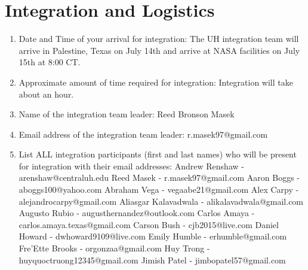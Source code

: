 \newpage
\section{Integration and Logistics}
\label{sec:Logistics}

\hspace*{0.5cm}
\begin{minipage}{\linewidth-0.5cm}
  \begin{enumerate}[label = \Alph*.]
  \item Date and Time of your arrival for integration: \newline
    The UH integration team will arrive in Palestine, Texas on July 14th and arrive at NASA facilities on July 15th at 8:00 CT.
  \item Approximate amount of time required for integration: \newline
    Integration will take about an hour.
  \item Name of the integration team leader: Reed Bronson Masek    
  \item Email address of the integration team leader: r.masek97@gmail.com
  \item List ALL integration participants (first and last names) who will be present for integration with their email addresses: \newline
    Andrew Renshaw - arenshaw@centraluh.edu \newline
    Reed Masek - r.masek97@gmail.com \newline
    Aaron Boggs - aboggs100@yahoo.com \newline
    Abraham Vega - vegaabe21@gmail.com \newline
    Alex Carpy - alejandrocarpy@gmail.com \newline
    Aliasgar Kalavadwala - alikalavadwala@gmail.com \newline
    Augusto Rubio - augusthernandez@outlook.com \newline
    Carlos Amaya - carlos.amaya.texas@gmail.com \newline
    Carson Bush - cjb2015@live.com \newline
    Daniel Howard - dwhoward9109@live.com \newline
    Emily Humble - erhumble@gmail.com \newline
    Fre'Ette Brooks - orgonzaa@gmail.com \newline
    Huy Trong - huyquoctruong12345@gmail.com \newline
    Jimish Patel - jimbopatel57@gmail.com \newline

\end{enumerate}
\end{minipage}

